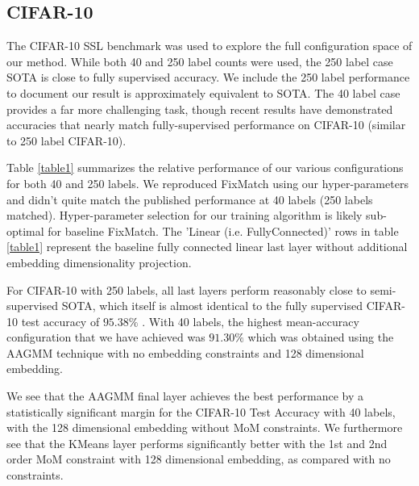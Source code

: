 \documentclass[10pt,twocolumn,letterpaper]{article}
\begin{document}
\subsection{CIFAR-10}


The CIFAR-10 SSL benchmark was used to explore the full configuration space of our method.
While both 40 and 250 label counts were used, the 250 label case SOTA is close to fully supervised accuracy.
We include the 250 label performance to document our result is approximately equivalent to SOTA. 
The 40 label case provides a far more challenging task, though recent results have demonstrated accuracies that nearly match fully-supervised performance on CIFAR-10 (similar to 250 label CIFAR-10).

Table \ref{table1} summarizes the relative performance of our various configurations for both 40 and 250 labels.
We reproduced FixMatch \cite{sohn2020fixmatch} using our hyper-parameters and didn't quite match the published performance at 40 labels (250 labels matched). 
Hyper-parameter selection for our training algorithm is likely sub-optimal for baseline FixMatch.
The 'Linear (i.e. FullyConnected)' rows in table \ref{table1} represent the baseline fully connected linear last layer without additional embedding dimensionality projection.

For CIFAR-10 with 250 labels, all last layers perform reasonably close to semi-supervised SOTA, which itself is almost identical to the fully supervised CIFAR-10 test accuracy of $95.38\%$ \cite{wang2022freematch}.  
With 40 labels, the highest mean-accuracy configuration that we have achieved was $91.30\%$ which was obtained using the AAGMM technique with no embedding constraints and 128 dimensional embedding.

We see that the AAGMM final layer achieves the best performance by a statistically significant margin for the CIFAR-10 Test Accuracy with 40 labels, with the 128 dimensional embedding without MoM constraints.  We furthermore see that the KMeans layer performs significantly better with the 1st and 2nd order MoM constraint with 128 dimensional embedding, as compared with no constraints.  
\end{document}
